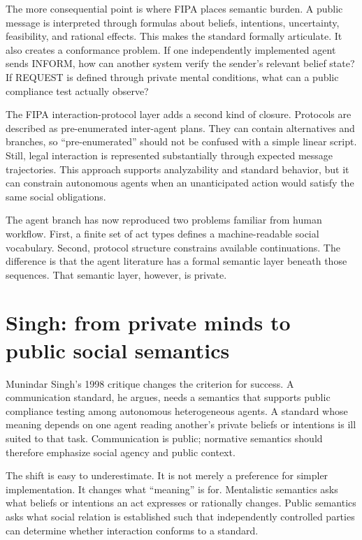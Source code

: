 \documentclass[11pt]{article}
\begin{document}
The more consequential point is where FIPA places semantic burden. A public message is interpreted through formulas about beliefs, intentions, uncertainty, feasibility, and rational effects. This makes the standard formally articulate. It also creates a conformance problem. If one independently implemented agent sends INFORM, how can another system verify the sender's relevant belief state? If REQUEST is defined through private mental conditions, what can a public compliance test actually observe? \cite{fipa2002cal}

The FIPA interaction-protocol layer adds a second kind of closure. Protocols are described as pre-enumerated inter-agent plans. They can contain alternatives and branches, so ``pre-enumerated'' should not be confused with a simple linear script. Still, legal interaction is represented substantially through expected message trajectories. This approach supports analyzability and standard behavior, but it can constrain autonomous agents when an unanticipated action would satisfy the same social obligations.

The agent branch has now reproduced two problems familiar from human workflow. First, a finite set of act types defines a machine-readable social vocabulary. Second, protocol structure constrains available continuations. The difference is that the agent literature has a formal semantic layer beneath those sequences. That semantic layer, however, is private.

\section{Singh: from private minds to public social semantics}
Munindar Singh's 1998 critique changes the criterion for success. A communication standard, he argues, needs a semantics that supports public compliance testing among autonomous heterogeneous agents. A standard whose meaning depends on one agent reading another's private beliefs or intentions is ill suited to that task. Communication is public; normative semantics should therefore emphasize social agency and public context. \cite{singh1998rethinking}

The shift is easy to underestimate. It is not merely a preference for simpler implementation. It changes what ``meaning'' is for. Mentalistic semantics asks what beliefs or intentions an act expresses or rationally changes. Public semantics asks what social relation is established such that independently controlled parties can determine whether interaction conforms to a standard.
\end{document}
